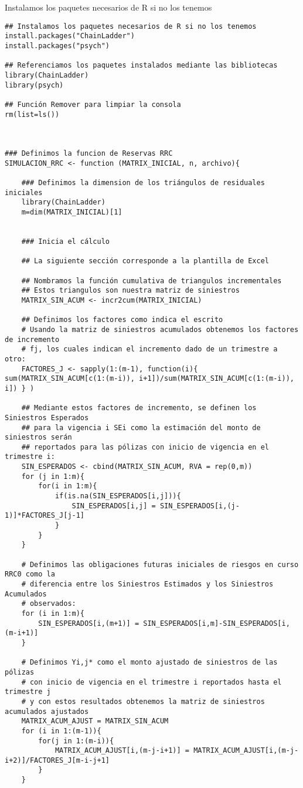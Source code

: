 \documentclass[11pt,twoside,openright,spanish]{report}
\numberwithin{equation}{chapter}
\numberwithin{figure}{chapter}
\numberwithin{table}{chapter}
\begin{document}
Instalamos los paquetes necesarios de R si no los tenemos

\begin{lstlisting}
## Instalamos los paquetes necesarios de R si no los tenemos
install.packages("ChainLadder")
install.packages("psych")

## Referenciamos los paquetes instalados mediante las bibliotecas
library(ChainLadder)
library(psych)

## Función Remover para limpiar la consola
rm(list=ls())



### Definimos la funcion de Reservas RRC
SIMULACION_RRC <- function (MATRIX_INICIAL, n, archivo){
	
	### Definimos la dimension de los triángulos de residuales iniciales
	library(ChainLadder)
	m=dim(MATRIX_INICIAL)[1]
	
	
	### Inicia el cálculo
	
	## La siguiente sección corresponde a la plantilla de Excel
	
	## Nombramos la función cumulativa de triangulos incrementales
	## Estos triangulos son nuestra matriz de siniestros
	MATRIX_SIN_ACUM <- incr2cum(MATRIX_INICIAL)
	
	## Definimos los factores como indica el escrito
	# Usando la matriz de siniestros acumulados obtenemos los factores de incremento
	# fj, los cuales indican el incremento dado de un trimestre a otro:
	FACTORES_J <- sapply(1:(m-1), function(i){ sum(MATRIX_SIN_ACUM[c(1:(m-i)), i+1])/sum(MATRIX_SIN_ACUM[c(1:(m-i)), i]) } )
	
	## Mediante estos factores de incremento, se definen los Siniestros Esperados
	## para la vigencia i SEi como la estimación del monto de siniestros serán 
	## reportados para las pólizas con inicio de vigencia en el trimestre i:
	SIN_ESPERADOS <- cbind(MATRIX_SIN_ACUM, RVA = rep(0,m))
	for (j in 1:m){
		for(i in 1:m){
			if(is.na(SIN_ESPERADOS[i,j])){
				SIN_ESPERADOS[i,j] = SIN_ESPERADOS[i,(j-1)]*FACTORES_J[j-1]
			}
		}
	}
	
	# Definimos las obligaciones futuras iniciales de riesgos en curso RRC0 como la 
	# diferencia entre los Siniestros Estimados y los Siniestros Acumulados
	# observados:
	for (i in 1:m){
		SIN_ESPERADOS[i,(m+1)] = SIN_ESPERADOS[i,m]-SIN_ESPERADOS[i,(m-i+1)]
	}
	
	# Definimos Yi,j* como el monto ajustado de siniestros de las pólizas
	# con inicio de vigencia en el trimestre i reportados hasta el trimestre j
	# y con estos resultados obtenemos la matriz de siniestros acumulados ajustados
	MATRIX_ACUM_AJUST = MATRIX_SIN_ACUM
	for (i in 1:(m-1)){
		for(j in 1:(m-i)){
			MATRIX_ACUM_AJUST[i,(m-j-i+1)] = MATRIX_ACUM_AJUST[i,(m-j-i+2)]/FACTORES_J[m-i-j+1]
		}
	}
	

\end{lstlisting}
\end{document}
